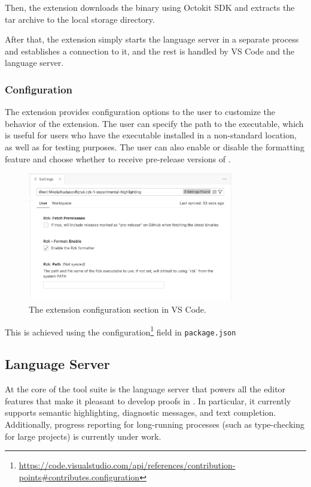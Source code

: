 Then, the extension downloads the binary using Octokit SDK and extracts the tar archive to the local storage directory.

After that, the extension simply starts the language server in a separate process and establishes a connection to it,
and the rest is handled by VS Code and the language server.

\subsubsection{Configuration}

The extension provides configuration options to the user to customize the behavior of the extension.
The user can specify the path to the \Rzk{} executable, which is useful for users who have the executable installed in a non-standard location, as well as for testing purposes.
The user can also enable or disable the formatting feature and choose whether to receive pre-release versions of \Rzk{}.

\begin{figure}
  \centering
  \includegraphics[width=0.8\textwidth]{figs/rzk-vscode-settings.png}
  \caption{The extension configuration section in VS Code.}
  \label{figure:vscode-settings}
\end{figure}

This is achieved using the configuration\footnote{
  \url{https://code.visualstudio.com/api/references/contribution-points\#contributes.configuration}}
field in \texttt{package.json}

\subsection{\Rzk{} Language Server}

At the core of the \Rzk{} tool suite is the language server that powers all the editor features that make it pleasant to develop proofs in \Rzk{}. In particular, it currently supports semantic highlighting, diagnostic messages, and text completion. Additionally, progress reporting for long-running processes (such as type-checking for large projects) is currently under work.

